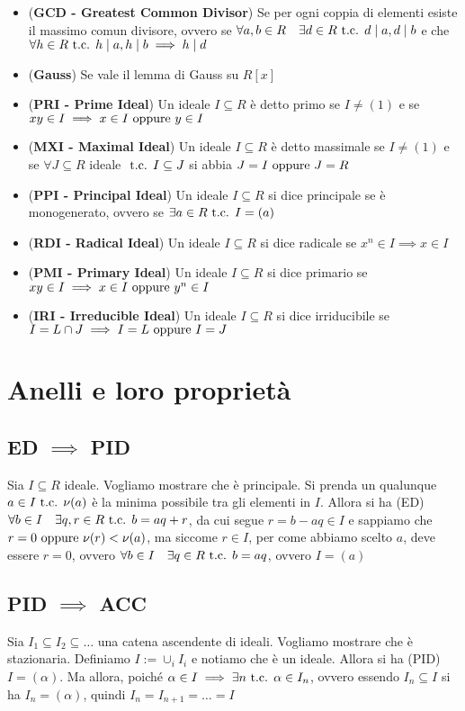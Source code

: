 \documentclass[a4paper,GeneralMath,NoNotes]{stdmdoc}
\begin{document}
\begin{itemize}
		\item ({\bf GCD - Greatest Common Divisor}) Se per ogni coppia di elementi esiste il massimo comun divisore, ovvero se $\forall a, b \in R \quad \exists d \in R \mbox{ t.c. } d \mid a, d \mid b$ e che $\forall h \in R \mbox{ t.c. } h \mid a, h \mid b \implies h \mid d$
		\item ({\bf Gauss}) Se vale il lemma di Gauss su $R[x]$
		\item ({\bf PRI - Prime Ideal}) Un ideale $I \subseteq R$ è detto primo se $I \neq (1)$ e se $xy \in I \implies x \in I \text{ oppure } y \in I$
		\item ({\bf MXI - Maximal Ideal}) Un ideale $I \subseteq R$ è detto massimale se $I \neq (1)$ e se $\forall J \subseteq R$ ideale $\mbox{ t.c. } I \subseteq J$ si abbia $J = I \text{ oppure } J = R$
		\item ({\bf PPI - Principal Ideal}) Un ideale $I \subseteq R$ si dice principale se è monogenerato, ovvero se $\exists a \in R \mbox{ t.c. } I = (a)$
		\item ({\bf RDI - Radical Ideal}) Un ideale $I \subseteq R$ si dice radicale se $x^n \in I \implies x \in I$
		\item ({\bf PMI - Primary Ideal}) Un ideale $I \subseteq R$ si dice primario se $xy \in I \implies x \in I \text{ oppure } y^n \in I$
		\item ({\bf IRI - Irreducible Ideal}) Un ideale $I \subseteq R$ si dice irriducibile se $I = L \cap J \implies I = L \text{ oppure } I = J$
	\end{itemize}

	\section*{Anelli e loro proprietà}
	\subsection{ED $\implies$ PID}
	Sia $I \subseteq R$ ideale. Vogliamo mostrare che è principale. Si prenda un qualunque $a \in I \mbox{ t.c. } \nu(a)$ è la minima possibile tra gli elementi in $I$. Allora si ha (ED) $\forall b \in I \quad \exists q,r \in R \mbox{ t.c. } b = aq + r$, da cui segue $r = b - aq \in I$ e sappiamo che $r = 0 \text{ oppure } \nu(r) < \nu(a)$, ma siccome $r \in I$, per come abbiamo scelto $a$, deve essere $r = 0$, ovvero $\forall b \in I \quad \exists q \in R \mbox{ t.c. } b = aq$, ovvero $I = (a)$
	
	\subsection{PID $\implies$ ACC}
	Sia $I_1 \subseteq I_2 \subseteq \ldots$ una catena ascendente di ideali. Vogliamo mostrare che è stazionaria. Definiamo $I := \cup_{i} I_i$ e notiamo che è un ideale. Allora si ha (PID) $I = (\alpha)$. Ma allora, poiché $\alpha \in I \implies \exists n \mbox{ t.c. } \alpha \in I_n$, ovvero essendo $I_n \subseteq I$ si ha $I_n = (\alpha)$, quindi $I_n = I_{n+1} = \ldots = I$
\end{document}
